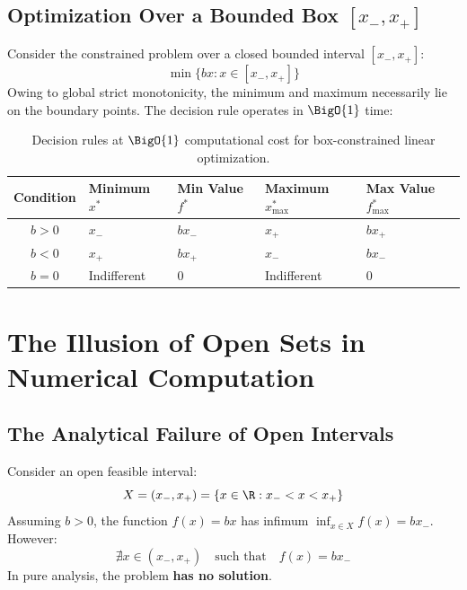 \subsection[Optimization Over a Bounded Box]{Optimization Over a Bounded Box $[x_-, x_+]$}
Consider the constrained problem over a closed bounded interval $[x_-, x_+]$:
\begin{equation}
\min \{ bx : x \in [x_-, x_+] \}
\end{equation}
Owing to global strict monotonicity, the minimum and maximum necessarily lie on the boundary points. The decision rule operates in $\BigO{1}$ time:

\begin{table}[H]
\centering
\small
\renewcommand{\arraystretch}{1.3}
\begin{tabularx}{\textwidth}{c Y Y Y Y}
\toprule
\textbf{Condition} & \textbf{Minimum $x^*$} & \textbf{Min Value $f^*$} & \textbf{Maximum $x^*_{\max}$} & \textbf{Max Value $f^*_{\max}$} \\
\midrule
$b > 0$ & $x_-$ & $b x_-$ & $x_+$ & $b x_+$ \\
$b < 0$ & $x_+$ & $b x_+$ & $x_-$ & $b x_-$ \\
$b = 0$ & Indifferent & $0$ & Indifferent & $0$ \\
\bottomrule
\end{tabularx}
\caption{Decision rules at $\BigO{1}$ computational cost for box-constrained linear optimization.}
\label{tab:linear-box-en}
\end{table}


\FloatBarrier
\section{The Illusion of Open Sets in Numerical Computation}
\label{sec:opt-open-sets}

\subsection{The Analytical Failure of Open Intervals}
Consider an open feasible interval:
\begin{equation}
X = (x_-, x_+) = \{ x \in \R : x_- < x < x_+ \}
\end{equation}
Assuming $b > 0$, the function $f(x) = bx$ has infimum $\inf_{x \in X} f(x) = b x_-$. However:
\begin{equation}
\nexists x \in (x_-, x_+) \quad \text{such that} \quad f(x) = b x_-
\end{equation}
In pure analysis, the problem \textbf{has no solution}.

